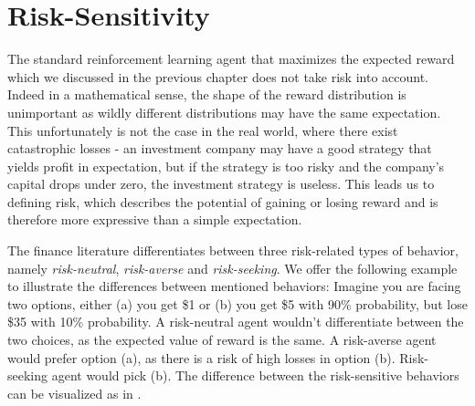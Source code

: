 

\section{Risk-Sensitivity}\label{sec:prelim:risk}

The standard reinforcement learning agent that maximizes the expected reward which we discussed in the previous chapter does not take risk into account. Indeed in a mathematical sense, the shape of the reward distribution is unimportant as wildly different distributions may have the same expectation. This unfortunately is not the case in the real world, where there exist catastrophic losses - an investment company may have a good strategy that yields profit in expectation, but if the strategy is too risky and the company's capital drops under zero, the investment strategy is useless. This leads us to defining risk, which describes the potential of gaining or losing reward and is therefore more expressive than a simple expectation.

The finance literature differentiates between three risk-related types of behavior, namely \textit{risk-neutral}, \textit{risk-averse} and \textit{risk-seeking}. We offer the following example to illustrate the differences between mentioned behaviors: Imagine you are facing two options, either (a) you get \$1 or (b) you get \$5 with 90\% probability, but lose \$35 with 10\% probability. A risk-neutral agent wouldn't differentiate between the two choices, as the expected value of reward is the same. A risk-averse agent would prefer option (a), as there is a risk of high losses in option (b). Risk-seeking agent would pick (b). The difference between the risk-sensitive behaviors can be visualized as in .

